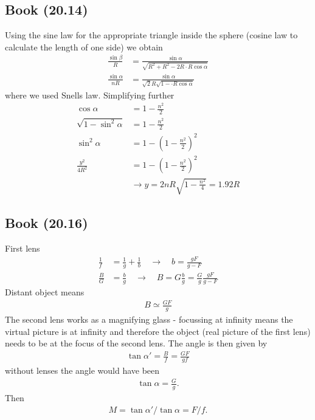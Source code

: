 \documentclass[../main.tex]{subfiles}
\begin{document}
\subsection{Book (20.14)}
Using the sine law for the appropriate triangle inside the sphere (cosine law to calculate the length of one side) we obtain
\begin{align}
\frac{\sin\beta}{R}&=\frac{\sin\alpha}{\sqrt{R^2+R^2-2R\cdot R\cos\alpha}}\\
\frac{\sin\alpha}{nR}&=\frac{\sin\alpha}{\sqrt{2}R\sqrt{1-\cdot R\cos\alpha}}
\end{align}
where we used Snells law. Simplifying further
\begin{align}
\cos\alpha&=1-\frac{n^2}{2}\\
\sqrt{1-\sin^2\alpha}&=1-\frac{n^2}{2}\\
\sin^2\alpha&=1-\left(1-\frac{n^2}{2}\right)^2\\
\frac{y^2}{4R^2}&=1-\left(1-\frac{n^2}{2}\right)^2\\
&\rightarrow y=2nR\sqrt{1-\frac{n^2}{4}}=1.92R
\end{align}

\subsection{Book (20.16)}
First lens
\begin{align}
\frac{1}{f}&=\frac{1}{g}+\frac{1}{b}\quad\rightarrow\quad b=\frac{gF}{g-F}\\
\frac{B}{G}&=\frac{b}{g}\quad\rightarrow\quad B=G\frac{b}{g}=\frac{G}{g}\frac{gF}{g-F}
\end{align}
Distant object means
\begin{align}
B\simeq\frac{GF}{g}
\end{align}
The second lens works as a magnifying glass - focussing at infinity means the virtual picture is at infinity and therefore the object (real picture of the first lens) needs to be at the focus of the second lens.
The angle is then given by
\begin{align}
\tan\alpha'=\frac{B}{f}=\frac{GF}{gf}
\end{align}
without lenses the angle would have been
\begin{align}
\tan\alpha=\frac{G}{g}.
\end{align}
Then
\begin{align}
M=\tan\alpha'/\tan\alpha=F/f.
\end{align}
\end{document}
